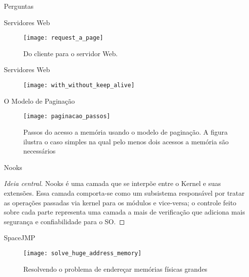 \documentclass[xcolor={usenames,svgnames,dvipsnames},brazil,english,12pt,aspectratio=149]{beamer}
\begin{document}
\begin{frame}{Perguntas}
  \tableofcontents
\end{frame}

\appendix

\begin{frame}{Servidores Web}
  \begin{figure}[!h]
    \centering
    \texttt{[image: request\_a\_page]}
    \caption*{Do cliente para o servidor Web.}
  \end{figure}
\end{frame}

\begin{frame}{Servidores Web}
  \begin{figure}[!h]
    \centering
    \texttt{[image: with\_without\_keep\_alive]}
  \end{figure}
\end{frame}

\begin{frame}{O Modelo de Paginação}
  \begin{figure}[!h]
    \centering
    \texttt{[image: paginacao\_passos]} 
    \caption*{Passos do acesso a memória usando o modelo de paginação. A figura ilustra o caso simples na qual pelo menos dois acessos a memória são necessários}
  \end{figure}
\end{frame}

\begin{frame}{Nooks}
  \begin{proof}[Ideia central]
Nooks é uma camada que se interpõe entre o Kernel e suas extensões. Essa camada
comporta-se como um subsistema responsável por tratar as operações passadas via
kernel para os módulos e vice-versa; o controle feito sobre cada parte
representa uma camada a mais de verificação que adiciona mais segurança e
confiabilidade para o SO.
  \end{proof}
\end{frame}

\begin{frame}{SpaceJMP}
  \begin{figure}[!h]
    \centering
    \texttt{[image: solve\_huge\_address\_memory]}
    \caption*{Resolvendo o problema de endereçar memórias físicas grandes}
  \end{figure}
\end{frame}
\end{document}
